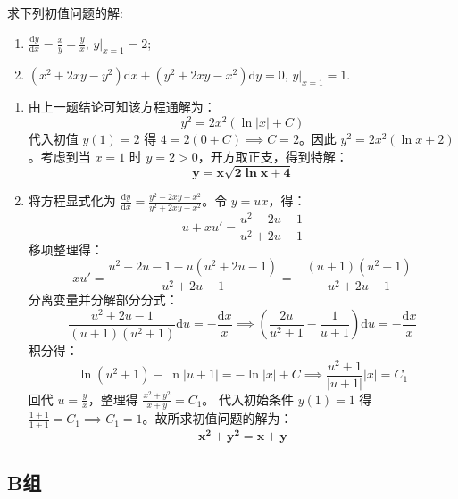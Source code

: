 \documentclass[lang=cn,11pt]{elegantbook}
\begin{document}
\begin{exercise}[求解齐次方程]
求下列初值问题的解:
\begin{enumerate}
    \item[(1)] $\displaystyle \frac{\mathrm{d}y}{\mathrm{d}x}=\frac{x}{y}+\frac{y}{x},\,y\big|_{x=1}=2$;
    \item[(2)] $\displaystyle (x^2+2xy-y^2)\mathrm{d}x+(y^2+2xy-x^2)\mathrm{d}y=0,\,y\big|_{x=1}=1$.
\end{enumerate}
\end{exercise}
\begin{solution}
\begin{enumerate}
    \item[(1)] 由上一题结论可知该方程通解为：
    \[
    y^2 = 2x^2(\ln|x| + C)
    \]
    代入初值 $y(1)=2$ 得 $4 = 2(0+C) \implies C=2$。因此 $y^2 = 2x^2(\ln x + 2)$。考虑到当 $x=1$ 时 $y=2>0$，开方取正支，得到特解：
    \[
    \mathbf{y = x\sqrt{2\ln x + 4}}
    \]
    
    \item[(2)] 将方程显式化为 $\displaystyle\frac{\mathrm{d}y}{\mathrm{d}x} = \frac{y^2-2xy-x^2}{y^2+2xy-x^2}$。令 $y=ux$，得：
    \[
    u+xu' = \frac{u^2-2u-1}{u^2+2u-1}
    \]
    移项整理得：
    \[
    xu' = \frac{u^2-2u-1-u(u^2+2u-1)}{u^2+2u-1} = -\frac{(u+1)(u^2+1)}{u^2+2u-1}
    \]
    分离变量并分解部分分式：
    \[
    \frac{u^2+2u-1}{(u+1)(u^2+1)}\mathrm{d}u = -\frac{\mathrm{d}x}{x} \implies \left(\frac{2u}{u^2+1} - \frac{1}{u+1}\right)\mathrm{d}u = -\frac{\mathrm{d}x}{x}
    \]
    积分得：
    \[
    \ln(u^2+1) - \ln|u+1| = -\ln|x| + C \implies \frac{u^2+1}{|u+1|}|x| = C_1
    \]
    回代 $u=\frac{y}{x}$，整理得 $\frac{x^2+y^2}{x+y} = C_1$。
    代入初始条件 $y(1)=1$ 得 $\frac{1+1}{1+1} = C_1 \implies C_1 = 1$。故所求初值问题的解为：
    \[
    \mathbf{x^2+y^2=x+y}
    \]
\end{enumerate}
\end{solution}

\subsection{B组}
\end{document}
